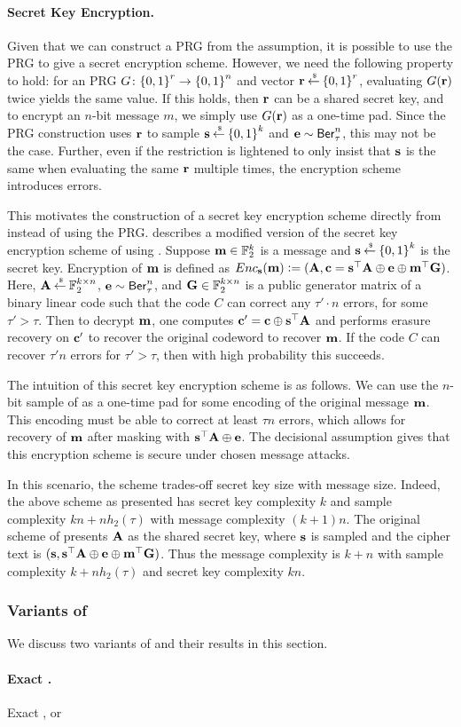 \paragraph{Secret Key Encryption.} Given that we can construct a PRG from the \LPN assumption, it is possible to use the PRG to give a secret encryption scheme.
However, we need the following property to hold: for an \LPN PRG $G \colon {\{0,1\}}^r \rightarrow {\{0,1\}}^n$ and vector ${\mathbf r} \mathbin{\stackrel{\mbox{\,\tiny \$}}{\gets}} {\{0,1\}}^r$, evaluating $G({\mathbf r})$ twice yields the same value.
If this holds, then ${\mathbf r}$ can be a shared secret key, and to encrypt an $n$-bit message $m$, we simply use $G({\mathbf r})$ as a one-time pad.
Since the PRG construction uses ${\mathbf r}$ to sample ${\mathbf s} \mathbin{\stackrel{\mbox{\,\tiny \$}}{\gets}} {\{0,1\}}^k$ and ${\mathbf e} \sim \mathsf{Ber}_\tau^n$, this may not be the case.
Further, even if the restriction is lightened to only insist that ${\mathbf s}$ is the same when evaluating the same ${\mathbf r}$ multiple times, the encryption scheme introduces errors.

This motivates the construction of a secret key encryption scheme directly from \LPN instead of using the \LPN PRG.
\cite{Piet12} describes a modified version of the secret key encryption scheme of \cite{ICALP:GilRobSeu08} using \LPN.
Suppose ${\mathbf m} \in {\mathbb F}_2^k$ is a message and ${\mathbf s} \mathbin{\stackrel{\mbox{\,\tiny \$}}{\gets}} {\{0,1\}}^k$ is the secret key.
Encryption of ${\mathbf m}$ is defined as $Enc_{\mathbf s}({\mathbf m}) {\;\vcentcolon=\;} ({\mathbf A}, {\mathbf c} = {\mathbf s}^\top{\mathbf A} \oplus {\mathbf e} \oplus {\mathbf m}^\top{\mathbf G})$.
Here, ${\mathbf A} \mathbin{\stackrel{\mbox{\,\tiny \$}}{\gets}} {\mathbb F}_2^{k\times n}$, ${\mathbf e} \sim \mathsf{Ber}_\tau^n$, and ${\mathbf G} \in {\mathbb F}_2^{k\times n}$ is a public generator matrix of a binary linear code such that the code $C$ can correct any $\tau'\cdot n$ errors, for some $\tau' > \tau$.
Then to decrypt ${\mathbf m}$, one computes ${\mathbf c}' = {\mathbf c} \oplus {\mathbf s}^\top {\mathbf A}$ and performs erasure recovery on ${\mathbf c}'$ to recover the original codeword to recover ${\mathbf m}$.
If the code $C$ can recover $\tau' n$ errors for $\tau' > \tau$, then with high probability this succeeds.

The intuition of this secret key encryption scheme is as follows.
We can use the $n$-bit sample of \LPN as a one-time pad for some encoding of the original message ${\mathbf m}$.
This encoding must be able to correct at least $\tau n $ errors, which allows for recovery of ${\mathbf m}$ after masking with ${\mathbf s}^\top {\mathbf A} \oplus {\mathbf e}$.
The decisional \LPN assumption gives that this encryption scheme is secure under chosen message attacks.

In this scenario, the scheme trades-off secret key size with message size.
Indeed, the above scheme as presented has secret key complexity $k$ and sample complexity $kn + nh_2(\tau)$ with message complexity $(k+1)n$.
The original scheme of \cite{ICALP:GilRobSeu08} presents ${\mathbf A}$ as the shared secret key, where ${\mathbf s}$ is sampled and the cipher text is $({\mathbf s}, {\mathbf s}^\top {\mathbf A} \oplus {\mathbf e} \oplus {\mathbf m}^\top{\mathbf G})$.
Thus the message complexity is $k + n$ with sample complexity $k + nh_2(\tau)$ and secret key complexity $kn$.




\subsubsection{Variants of \LPN}
We discuss two variants of \LPN and their results in this section.

\paragraph{Exact \LPN.} Exact \LPN, or \XLPN

